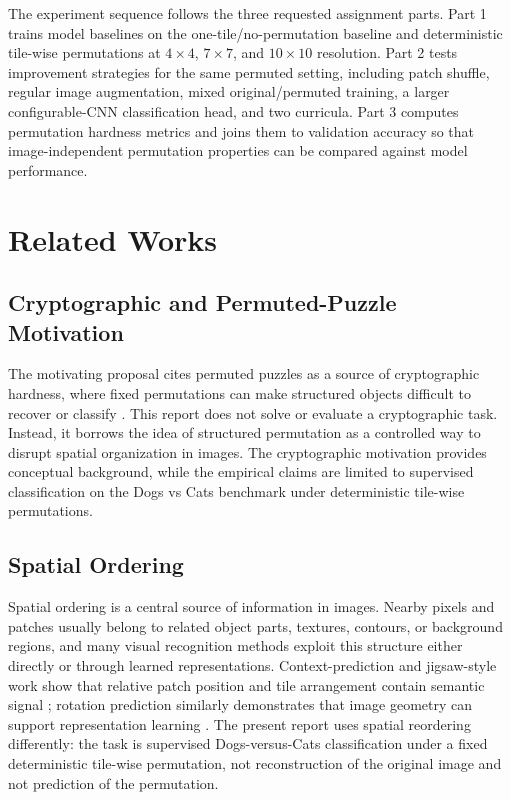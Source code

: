 \documentclass[12pt]{article}
\begin{document}
The experiment sequence follows the three requested assignment parts. Part 1 trains model baselines on the one-tile/no-permutation baseline and deterministic tile-wise permutations at $4 \times 4$, $7 \times 7$, and $10 \times 10$ resolution. Part 2 tests improvement strategies for the same permuted setting, including patch shuffle, regular image augmentation, mixed original/permuted training, a larger configurable-CNN classification head, and two curricula. Part 3 computes permutation hardness metrics and joins them to validation accuracy so that image-independent permutation properties can be compared against model performance.

\section{Related Works}

\subsection{Cryptographic and Permuted-Puzzle Motivation}

The motivating proposal cites permuted puzzles as a source of cryptographic hardness, where fixed permutations can make structured objects difficult to recover or classify \citep{boyle2019permuted}. This report does not solve or evaluate a cryptographic task. Instead, it borrows the idea of structured permutation as a controlled way to disrupt spatial organization in images. The cryptographic motivation provides conceptual background, while the empirical claims are limited to supervised classification on the Dogs vs Cats benchmark under deterministic tile-wise permutations.

\subsection{Spatial Ordering}

Spatial ordering is a central source of information in images. Nearby pixels and patches usually belong to related object parts, textures, contours, or background regions, and many visual recognition methods exploit this structure either directly or through learned representations. Context-prediction and jigsaw-style work show that relative patch position and tile arrangement contain semantic signal \citep{doersch2015unsupervised,noroozi2016unsupervised}; rotation prediction similarly demonstrates that image geometry can support representation learning \citep{gidaris2018unsupervised}. The present report uses spatial reordering differently: the task is supervised Dogs-versus-Cats classification under a fixed deterministic tile-wise permutation, not reconstruction of the original image and not prediction of the permutation.
\end{document}
